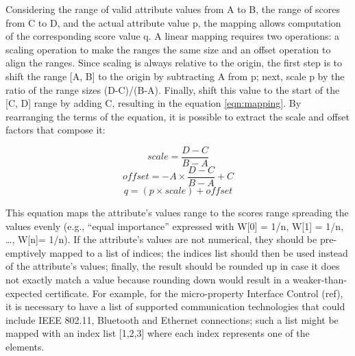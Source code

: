 Considering the range of valid attribute values from A to B, the range of scores from C to D, and the actual attribute value p, the mapping allows computation of the corresponding score value q.
A linear mapping requires two operations: a scaling operation to make the ranges the same size and an offset operation to align the ranges. Since scaling is always relative to the origin, the first step is to shift the range [A, B] to the origin by subtracting A from p; next, scale p by the ratio of the range sizes (D-C)/(B-A). Finally, shift this value to the start of the [C, D] range by adding C, resulting in the equation \ref{eqn:mapping}. By rearranging the terms of the equation, it is possible to extract the scale and offset factors that compose it:

\[scale = \frac{D - C }{B - A}\]
\[offset = -A \times \frac{D - C}{B - A} + C\]
\[q = \left ( p \times scale \right ) + offset\]


This equation maps the attribute's values range to the scores range spreading the values evenly (e.g., “equal importance” expressed with W[0] = 1/n, W[1] = 1/n, \dots , W[n]= 1/n). If the attribute's values are not numerical, they should be pre-emptively mapped to a list of indices; the indices list should then be used instead of the attribute's values; finally, the result should be rounded up in case it does not exactly match a value because rounding down would result in a weaker-than-expected certificate. For example, for the micro-property Interface Control (ref), it is necessary to have a list of supported communication technologies that could include IEEE 802.11, Bluetooth and Ethernet connections; such a list might be mapped with an index list [1,2,3] where each index represents one of the elements.

